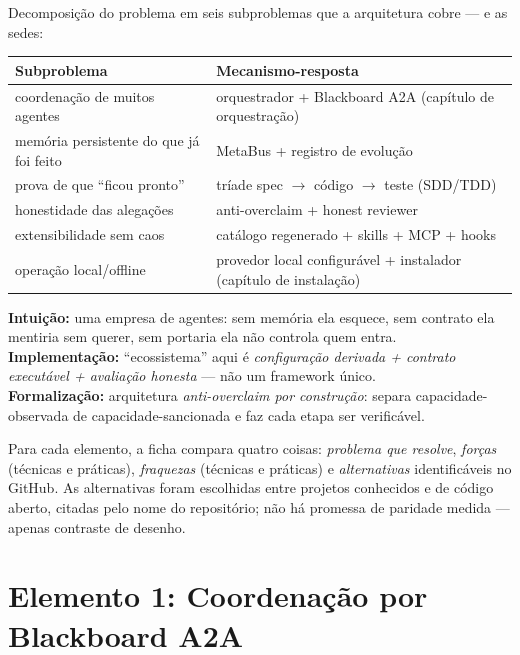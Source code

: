 \begin{resultado}
Decomposição do problema em seis subproblemas que a arquitetura cobre — e as sedes:\par
\smallskip
{\footnotesize
\begin{tabularx}{\linewidth}{YY}
\toprule
Subproblema & Mecanismo-resposta \\
\midrule
coordenação de muitos agentes & orquestrador + Blackboard A2A (capítulo de orquestração) \\
memória persistente do que já foi feito & MetaBus + registro de evolução \\
prova de que ``ficou pronto'' & tríade spec $\to$ código $\to$ teste (SDD/TDD) \\
honestidade das alegações & anti-overclaim + honest reviewer \\
extensibilidade sem caos & catálogo regenerado + skills + MCP + hooks \\
operação local/offline & provedor local configurável + instalador (capítulo de instalação) \\
\bottomrule
\end{tabularx}\par}
\end{resultado}

\begin{niveis}
\textbf{Intuição:} uma empresa de agentes: sem memória ela esquece, sem contrato ela
mentiria sem querer, sem portaria ela não controla quem entra.\\
\textbf{Implementação:} ``ecossistema'' aqui é \emph{configuração derivada + contrato
executável + avaliação honesta} — não um framework único.\\
\textbf{Formalização:} arquitetura \emph{anti-overclaim por construção}: separa
capacidade-observada de capacidade-sancionada e faz cada etapa ser verificável.
\end{niveis}

\begin{descricao}
Para cada elemento, a ficha compara quatro coisas: \emph{problema que resolve},
\emph{forças} (técnicas e práticas), \emph{fraquezas} (técnicas e práticas) e
\emph{alternativas} identificáveis no GitHub. As alternativas foram escolhidas
entre projetos conhecidos e de código aberto, citadas pelo nome do repositório;
não há promessa de paridade medida — apenas contraste de desenho.
\end{descricao}

\clearpage
\section{Elemento 1: Coordenação por Blackboard A2A}

